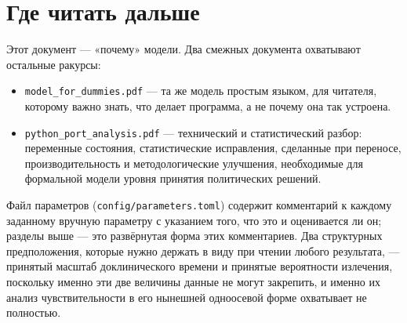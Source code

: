 \documentclass[12pt,a4paper]{article}
\newcommand{\id}[1]{\texttt{#1}}
\begin{document}
\section{Где читать дальше}

Этот документ --- «почему» модели. Два смежных документа охватывают остальные ракурсы:

\begin{itemize}[nosep]
  \item \id{model\_for\_dummies.pdf} --- та же модель простым языком, для читателя, которому важно знать, что
        делает программа, а не почему она так устроена.
  \item \id{python\_port\_analysis.pdf} --- технический и статистический разбор: переменные состояния,
        статистические исправления, сделанные при переносе, производительность и методологические улучшения,
        необходимые для формальной модели уровня принятия политических решений.
\end{itemize}

Файл параметров (\id{config/parameters.toml}) содержит комментарий к каждому заданному вручную параметру с
указанием того, что это и оценивается ли он; разделы выше --- это развёрнутая форма этих комментариев. Два
структурных предположения, которые нужно держать в виду при чтении любого результата, --- принятый масштаб
доклинического времени и принятые вероятности излечения, поскольку именно эти две величины данные не могут
закрепить, и именно их анализ чувствительности в его нынешней одноосевой форме охватывает не полностью.
\end{document}

